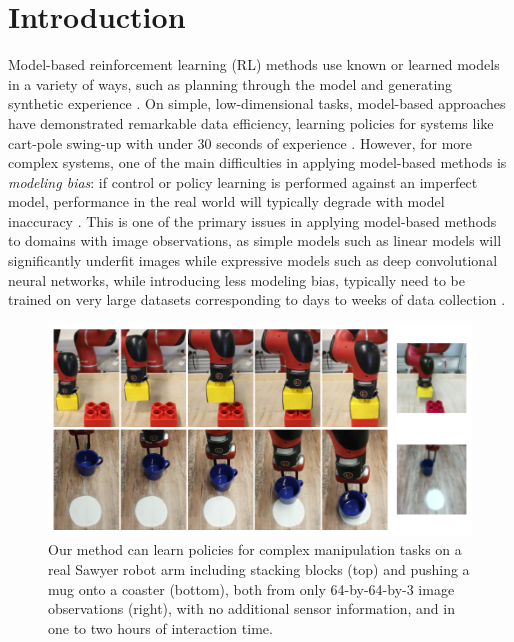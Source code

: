 \section{Introduction}
\label{sec:intro}

Model-based reinforcement learning (RL) methods use known or learned models in a variety of ways, such as planning through the model and generating synthetic experience \citep{dyna,rl-robotics-survey}. On simple, low-dimensional tasks, model-based approaches have demonstrated remarkable data efficiency, learning policies for systems like cart-pole swing-up with under 30 seconds of experience \citep{pilco,ode}. However, for more complex systems, one of the main difficulties in applying model-based methods is \emph{modeling bias}: if control or policy learning is performed against an imperfect model, performance in the real world will typically degrade with model inaccuracy \citep{pilco}. This is one of the primary issues in applying model-based methods to domains with image observations, as simple models such as linear models will significantly underfit images while expressive models such as deep convolutional neural networks, while introducing less modeling bias, typically need to be trained on very large datasets corresponding to days to weeks of data collection \citep{dvf,l2g,l2p}.

\begin{figure}
    \centering
    \includegraphics[width=0.9\linewidth]{img/solar/diag.png}
    \caption{Our method can learn policies for complex manipulation tasks on a real Sawyer robot arm including stacking blocks (top) and pushing a mug onto a coaster (bottom), both from only \mbox{64-by-64-by-3} image observations (right), with no additional sensor information, and in one to two hours of interaction time.}
    \label{fig:diag}
    \vspace{-.5em}
\end{figure}

